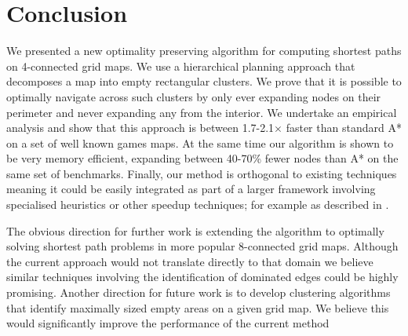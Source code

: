 \section{Conclusion}
We presented a new optimality preserving algorithm for computing shortest paths
on 4-connected grid maps.
We use a hierarchical planning approach that decomposes a map into empty rectangular clusters.
We prove that it is possible to optimally navigate across such clusters by only ever
expanding nodes on their perimeter and never expanding any from the interior.
We undertake an empirical analysis and show that this approach is between 1.7-2.1$\times$ faster than
standard A* on a set of well known games maps. 
At the same time our algorithm is shown to be very memory efficient, 
expanding between 40-70\% fewer nodes than A* on the same set of benchmarks.
Finally, our method is orthogonal to existing techniques meaning it could be easily integrated
as part of a larger framework involving specialised heuristics or other speedup techniques; for example as described in \cite{bjornsoon05,bjornsson06}. 
\par
The obvious direction for further work is extending the algorithm to optimally solving 
shortest path problems in more popular 8-connected grid maps. 
Although the current approach would not translate directly to that domain we believe similar
techniques involving the identification of dominated edges could be highly promising.
Another direction for future work is to develop clustering algorithms that identify maximally
sized empty areas on a given grid map.
We believe this would significantly improve the performance of the current method 
